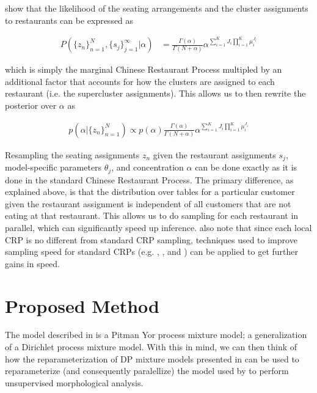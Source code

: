 \documentclass{article}
\begin{document}
\cite{lovell2012} show that the likelihood of the seating arrangements
and the cluster assignments to restaurants can be expressed as

\begin{align}
  P(\{z_n\}_{n=1}^N, \{s_j\}_{j=1}^\infty | \alpha) &=
  \frac{\Gamma(\alpha)}{\Gamma(N + \alpha)} \alpha^{\sum_{i=1}^K J_i \prod_{i=1}^K \mu_i^{J_i}}
\end{align}

which is simply the marginal Chinese Restaurant Process multipled by
an additional factor that accounts for how the clusters are assigned
to each restaurant (i.e. the supercluster assignments). This allows us
to then rewrite the posterior over $\alpha$ as

\begin{align}
  p(\alpha | \{z_n\}_{n=1}^N) \propto p(\alpha) \frac{\Gamma(\alpha)}{\Gamma(N + \alpha)} \alpha^{\sum_{i=1}^K J_i \prod_{i=1}^K \mu_i^{J_i}}
\end{align}

Resampling the seating assignments $z_n$ given the restaurant
assignments $s_j$, model-specific parameters $\theta_j$, and
concentration $\alpha$ can be done exactly as it is done in the
standard Chinese Restaurant Process. The primary difference, as
explained above, is that the distribution over tables for a particular
customer given the restaurant assignment is independent of all
customers that are not eating at that restaurant. This allows us to do
sampling for each restaurant in parallel, which can significantly
speed up inference. \cite{lovell2012} also note that since each local
CRP is no different from standard CRP sampling, techniques used to
improve sampling speed for standard CRPs (e.g. \cite{neal2000},
\cite{walker2007}, and \cite{papaspiliopoulos2008}) can be applied to
get further gains in speed.

\section{Proposed Method}
\label{sec:proposed-method}

The model described in \cite{goldwater2011} is a Pitman Yor process
mixture model; a generalization of a Dirichlet process mixture
model. With this in mind, we can then think of how the
reparameterization of DP mixture models presented in \cite{lovell2012} can be
used to reparameterize (and consequently paralellize) the model used
by \cite{goldwater2011} to perform unsupervised morphological
analysis.
\end{document}
